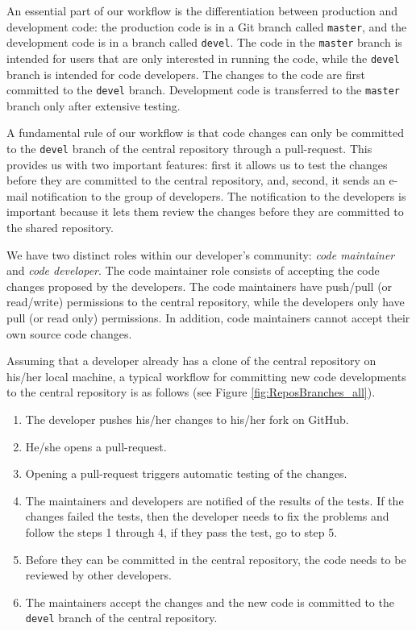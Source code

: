 An essential part of our workflow is the differentiation between production and
development code: the production code is in a Git branch called
\texttt{master}, and the
development code is in a branch called \texttt{devel}.
The code in the \texttt{master} branch is intended for users that are only
interested in
running the code, while the \texttt{devel} branch is intended for code
developers. The changes to the code are first committed to the \texttt{devel}
branch.
Development code is transferred to the \texttt{master} branch only after
extensive
testing.

A fundamental rule of our workflow is that code changes can only be
committed to the \texttt{devel} branch of the central repository through a
pull-request. This provides us with two important features: first it allows us
to test the changes before they are committed to the central
repository, and, second, it sends an e-mail notification to the group of
developers. The notification to the developers is important because  it lets
them  review the changes before they are committed to the shared repository.

We have two distinct roles within our developer's community: \emph{code
maintainer}
and \emph{code developer}. The code maintainer role consists of accepting the
code changes proposed by the developers. The code maintainers have push/pull
(or read/write) permissions to the central repository, while the developers
only
have pull (or read only) permissions. In addition, code maintainers cannot
accept their
own source code changes.

Assuming that a developer already has a clone of the central repository on
his/her local machine, a typical workflow for committing new code developments
to the central repository is as follows (see Figure
\ref{fig:ReposBranches_all}).
\begin{enumerate}
\item The developer pushes his/her changes to his/her fork on GitHub.
\item He/she opens a pull-request.
\item Opening a pull-request triggers automatic testing of the changes.
\item The maintainers and developers are notified of the results of the tests.
If the changes failed the tests, then the developer needs to fix the problems
and follow the steps 1 through 4, if they pass the test, go to step 5.
\item Before they can be committed in the central repository, the code needs to
be
reviewed by other developers.
\item The maintainers accept the changes and the new code is committed to the
  \texttt{devel} branch of the central repository.
\end{enumerate}

